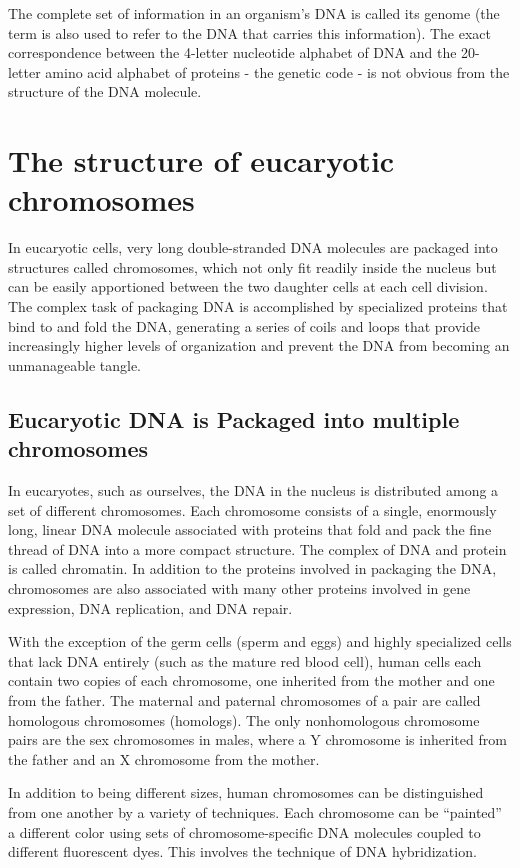 The complete set of information in an organism’s DNA is called its genome
(the term is also used to refer to the DNA that carries this information).
The exact correspondence between the 4-letter nucleotide alphabet
of DNA and the 20-letter amino acid alphabet of proteins - the genetic
code - is not obvious from the structure of the DNA molecule.

\section{The structure of eucaryotic chromosomes}

In eucaryotic cells, very long double-stranded DNA molecules are packaged
into structures called chromosomes, which not only fit readily inside the
nucleus but can be easily apportioned between the two daughter cells at
each cell division. The complex task of packaging DNA is accomplished
by specialized proteins that bind to and fold the DNA, generating a series
of coils and loops that provide increasingly higher levels of organization
and prevent the DNA from becoming an unmanageable tangle.

\subsection{Eucaryotic DNA is Packaged into multiple chromosomes}

In eucaryotes, such as ourselves, the DNA in the nucleus is distributed
among a set of different chromosomes.
Each chromosome consists of a single, enormously long,
linear DNA molecule associated with proteins that fold and pack the fine
thread of DNA into a more compact structure. The complex of DNA and
protein is called chromatin. In addition to the proteins involved in packaging
the DNA, chromosomes are also associated with many other proteins
involved in gene expression, DNA replication, and DNA repair.

With the exception of the germ cells (sperm and eggs) and highly specialized
cells that lack DNA entirely (such as the mature red blood cell),
human cells each contain two copies of each chromosome, one inherited
from the mother and one from the father. The maternal and paternal
chromosomes of a pair are called homologous chromosomes (homologs).
The only nonhomologous chromosome pairs are the sex chromosomes
in males, where a Y chromosome is inherited from the father and an X
chromosome from the mother.

In addition to being different sizes, human chromosomes can be distinguished
from one another by a variety of techniques. Each chromosome
can be “painted” a different color using sets of chromosome-specific
DNA molecules coupled to different fluorescent dyes. This
involves the technique of DNA hybridization.

